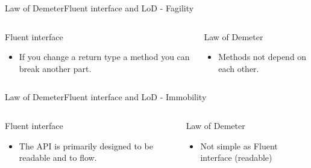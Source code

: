 \documentclass[10pt]{beamer}
\begin{document}
\begin{frame}{Law of Demeter}{Fluent interface and LoD - Fagility}
  \begin{columns}[T]
      \begin{column}{.5\textwidth}
    Fluent interface
    \begin{itemize}
      \item If you change a return type a method you can break another part.
    \end{itemize}
      \end{column}
       \hfill
      \begin{column}{.5\textwidth}
    Law of Demeter
        \begin{itemize}
      \item Methods not depend on each other.
    \end{itemize}
      \end{column}
    \end{columns}
\end{frame}

\begin{frame}{Law of Demeter}{Fluent interface and LoD - Immobility}
  \begin{columns}[T]
      \begin{column}{.5\textwidth}
    Fluent interface
    \begin{itemize}
      \item The API is primarily designed to be readable and to flow.
    \end{itemize}
      \end{column}
       \hfill
      \begin{column}{.5\textwidth}
    Law of Demeter
        \begin{itemize}
      \item Not simple as Fluent interface (readable)
    \end{itemize}
      \end{column}
    \end{columns}
\end{frame}


\end{document}
